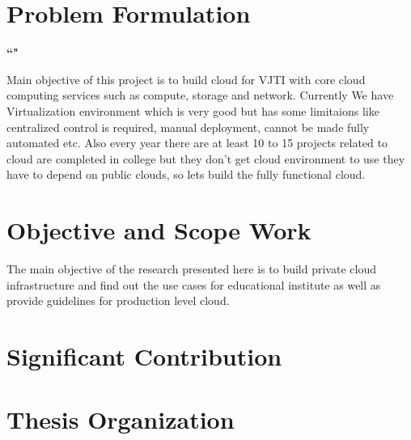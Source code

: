 \section{Problem Formulation}
 \par
 \textbf{\textquotedblleft \@title"}
 
 \par Main objective of this project is to build cloud for VJTI with core cloud computing services such as compute, storage and network. Currently We have Virtualization environment which is very good but has some limitaions like centralized control is required, manual deployment, cannot be made fully automated etc. Also every year there are at least 10 to 15 projects related to cloud are completed in college but they don't get cloud environment to use they have to depend on public clouds, so lets build the fully functional cloud. 

\section{Objective and Scope Work}

The main objective of the research presented here is to build private cloud infrastructure and find out the use cases for educational institute as well as provide guidelines for production level cloud.  

\section{Significant Contribution}

\section{Thesis Organization}

\makeatother